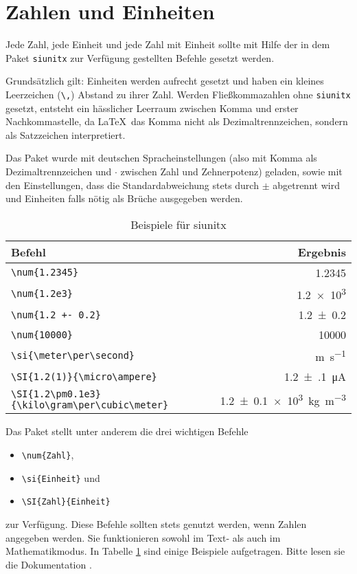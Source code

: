 \section{Zahlen und Einheiten}

Jede Zahl, jede Einheit und jede Zahl mit Einheit sollte mit Hilfe der in dem Paket \texttt{siunitx} zur Verfügung gestellten Befehle gesetzt werden.

Grundsätzlich gilt: Einheiten werden aufrecht gesetzt und haben ein kleines Leerzeichen (\verb+\,+) Abstand zu ihrer Zahl. 
Werden Fließkommazahlen ohne \texttt{siunitx} gesetzt, entsteht ein hässlicher Leerraum zwischen Komma und erster Nachkommastelle, da \LaTeX \ das Komma nicht als Dezimaltrennzeichen, sondern als Satzzeichen interpretiert.

Das Paket wurde mit deutschen Spracheinstellungen (also mit Komma als Dezimaltrennzeichen und $\cdot$ zwischen Zahl und Zehnerpotenz) geladen, sowie mit den Einstellungen, dass die Standardabweichung stets durch $\pm$ abgetrennt wird und Einheiten falls nötig als Brüche ausgegeben werden.

\begin{table}[!h]
    \centering
    \caption{Beispiele für siunitx}
    \label{tab:si}
    \begin{tabular}{l r}
        \toprule
        Befehl     &   Ergebnis \\
        \midrule
        \verb+\num{1.2345}+ & \num{1.2345} \\
        \verb+\num{1.2e3}+ & \num{1.2e3} \\
        \verb_\num{1.2 +- 0.2}_ & \num{1.2+-0.2} \\
        \verb+\num{10000}+ & \num{10000} \\
        \verb+\si{\meter\per\second}+ & \si{\meter\per\second} \\
        \verb+\SI{1.2(1)}{\micro\ampere}+ & \SI{1.2(1)}{\micro\ampere} \\
        \verb+\SI{1.2\pm0.1e3}{\kilo\gram\per\cubic\meter}+ & \SI{1.2\pm0.1e3}{\kilo\gram\per\cubic\meter} \\
        \bottomrule 
    \end{tabular}
\end{table}

Das Paket stellt unter anderem die drei wichtigen Befehle
\begin{itemize}
    \item \texttt{\textbackslash num\{Zahl\}},
    \item \texttt{\textbackslash si\{Einheit\}} und
    \item \texttt{\textbackslash SI\{Zahl\}\{Einheit\}}
\end{itemize}
zur Verfügung.
Diese Befehle sollten stets genutzt werden, wenn Zahlen angegeben werden. 
Sie funktionieren sowohl im Text- als auch im Mathematikmodus.
In Tabelle \ref{tab:si} sind einige Beispiele aufgetragen. Bitte lesen sie die Dokumentation \cite{siunitx}.

